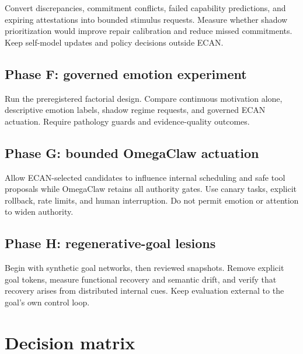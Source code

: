 \documentclass[11pt]{article}
\begin{document}
Convert discrepancies, commitment conflicts, failed capability predictions,
and expiring attestations into bounded stimulus requests.  Measure whether
shadow prioritization would improve repair calibration and reduce missed
commitments.  Keep self-model updates and policy decisions outside ECAN.

\subsection{Phase F: governed emotion experiment}

Run the preregistered factorial design.  Compare continuous motivation alone,
descriptive emotion labels, shadow regime requests, and governed ECAN actuation.
Require pathology guards and evidence-quality outcomes.

\subsection{Phase G: bounded OmegaClaw actuation}

Allow ECAN-selected candidates to influence internal scheduling and safe tool
proposals while OmegaClaw retains all authority gates.  Use canary tasks,
explicit rollback, rate limits, and human interruption.  Do not permit emotion
or attention to widen authority.

\subsection{Phase H: regenerative-goal lesions}

Begin with synthetic goal networks, then reviewed snapshots.  Remove explicit
goal tokens, measure functional recovery and semantic drift, and verify that
recovery arises from distributed internal cues.  Keep evaluation external to
the goal's own control loop.

\section{Decision matrix}
\end{document}
